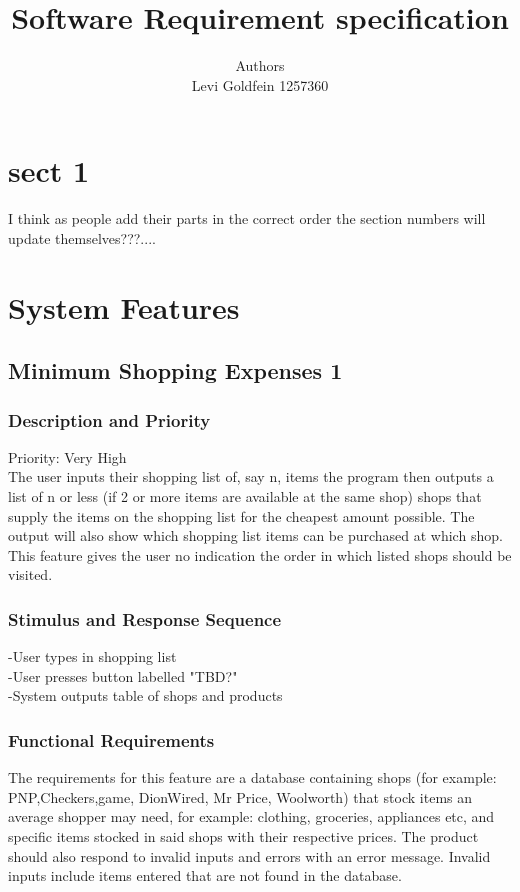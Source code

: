 \documentclass[12pt]{article}
\newenvironment{Project}[2][Project]{\begin{trivlist}
\item[\hskip \labelsep {\bfseries #1}\hskip \labelsep {\bfseries #2.}]}{\end{trivlist}}
\begin{document}
 
 
\title{Software Requirement specification }
\author{Authors\\Levi Goldfein 1257360}
\maketitle
 
\begin{Project}{: Shopping Route Recommender}

\end{Project}
\section{sect 1} 
I think as people add their parts in the correct order the section numbers will update themselves???....
\section{System Features}
\subsection{Minimum Shopping Expenses 1}
\subsubsection{Description and Priority}
Priority: Very High\\
 The user inputs their shopping list of, say n, items the program then outputs a list of n or less (if 2 or more items are available at the same shop) shops that supply the items on the shopping list for the cheapest amount possible. The output will also show which shopping list items can be purchased at which shop. This feature gives the user no indication the order in which listed shops should be visited.  
 \subsubsection{Stimulus and Response Sequence}     -User types in shopping list\\
-User presses button labelled "TBD?"\\
-System outputs table of shops and products\\
 \subsubsection{Functional Requirements}
 The requirements for this feature are a database  containing shops (for example: PNP,Checkers,game, DionWired, Mr Price, Woolworth) that stock items an average shopper may need, for example: clothing, groceries, appliances etc, and specific items stocked in said shops with their respective prices. The product should also respond to invalid inputs and errors with an error message. Invalid inputs include items entered that are not found in the database.
 
\end{document}
